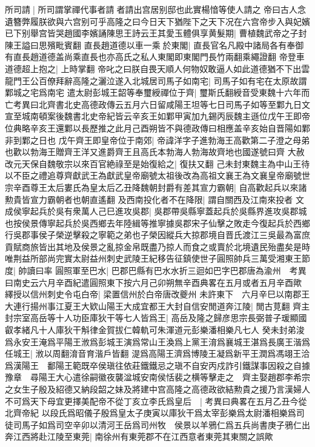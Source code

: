 所司請|{
	所司謂掌禪代事者請者請出宫居别邸也此實楊愔等使人請之}
帝曰古人念遺簪弊履朕欲與六宫别可乎高隆之曰今日天下猶陛下之天下况在六宫帝步入與妃嬪已下别舉宫皆哭趙國李嬪誦陳思王詩云王其愛玉體俱享黄髮期|{
	曹植魏武帝之子封陳王謚曰思殯毗賓翻}
直長趙道德以車一乘於東閣|{
	直長官名凡殿中諸局各有奉御有直長趙道德盖尚乘直長也亦高氏之私人東閣即東閣門長竹兩翻乘繩證翻}
帝登車道德超上抱之|{
	上時掌翻}
帝叱之曰朕自畏天順人何物奴敢逼人如此道德猶不下出雲龍門王公百僚拜辭高隆之灑泣遂入北城居司馬子如南宅|{
	司馬子如有宅在太原故謂鄴城之宅爲南宅}
遣太尉彭城王韶等奉璽綬禪位于齊|{
	璽斯氏翻綬音受東魏十六年而亡考異曰北齊書北史高德政傳云五月六日留咸陽王坦等七日司馬子如等至鄴九日文宣至城南頓案後魏書北史帝紀皆云辛亥王如鄴甲寅加九錫丙辰魏主遜位戊午王即帝位典略辛亥王還鄴以長歷推之此月己酉朔皆不與德政傳曰相應盖辛亥始自晋陽如鄴非到鄴之日也}
戊午齊王即皇帝位于南郊|{
	帝諱洋字子進勃海王高歡第二子澄之母弟也歡以勃海王贈齊王洋又進爵齊王且高氏本勃海人勃海故齊地也國遂號曰齊}
大赦改元天保自魏敬宗以來百官絶祿至是始復給之|{
	復扶又翻}
己未封東魏主為中山王待以不臣之禮追尊齊獻武王為獻武皇帝廟號太祖後改為高祖文襄王為文襄皇帝廟號世宗辛酉尊王太后婁氏為皇太后乙丑降魏朝封爵有差其宣力霸朝|{
	自高歡起兵以來諸勲貴皆宣力霸朝者也朝直遙翻}
及西南投化者不在降限|{
	謂自關西及江南來投者}
文成侯寧起兵於吳有衆萬人己巳進攻吳郡|{
	吳郡帶吳縣寧蓋起兵於吳縣界進攻吳郡城也按侯景傳寧起兵於吳西鄉去年陸緝等推寧據吳郡宋子仙擊之敗走今復起兵於西鄉}
行吳郡事侯子榮逆擊殺之寧範之弟也子榮因縱兵大掠郡境自晋氏渡江三吳最為富庶貢賦商旅皆出其地及侯景之亂掠金帛既盡乃掠人而食之或賣於北境遺民殆盡矣是時唯荆益所部尚完實太尉益州刺史武陵王紀移告征鎮使世子圓照帥兵三萬受湘東王節度|{
	帥讀曰率}
圓照軍至巴水|{
	巴郡巴縣有巴水水折三迴如巴字巴郡唐為渝州　考異曰南史云六月辛酉紀遣圓照東下按六月己卯朔無辛酉典畧在五月或者五月辛酉歟}
繹授以信州刺史令屯白帝|{
	梁置信州於白帝唐改夔州}
未許東下　六月辛巳以南郡王大連行揚州事江夏王大欵山陽王大成宜都王大封自信安閒道奔江陵|{
	閒古莧翻}
齊主封宗室高岳等十人功臣庫狄干等七人皆爲王|{
	高岳及隆之歸彦思宗長弼普子瑗顯國叡孝緒凡十人庫狄干斛律金賀拔仁韓軌可朱渾道元彭樂潘相樂凡七人}
癸未封弟浚爲永安王淹爲平陽王浟爲彭城王演爲常山王渙爲上黨王淯爲襄城王湛爲長廣王湝爲任城王|{
	浟以周翻淯音育湝戶皆翻}
湜爲高陽王濟爲博陵王凝爲新平王潤爲馮翊王洽爲漢陽王　鄱陽王範既卒侯瑱往依莊鐵鐵忌之瑱不自安丙戍詐引鐵謀事因殺之自據豫章　尋陽王大心遣徐嗣徽夜襲湓城安南侯恬裴之横等擊走之　齊主娶趙郡李希宗之女生子殷及紹德又納段韶之妹及將建中宫高隆之高德政欲結勲貴之援乃言漢婦人不可爲天下母宜更擇美配帝不從丁亥立李氏爲皇后　|{
	考異曰典畧在五月乙丑今從北齊帝紀}
以段氏爲昭儀子殷爲皇太子庚寅以庫狄干爲太宰彭樂爲太尉潘相樂爲司徒司馬子如爲司空辛卯以清河王岳爲司州牧　侯景以羊鴉仁爲五兵尚書庚子鴉仁出奔江西將赴江陵至東莞|{
	南徐州有東莞郡不在江西意者東莞其東關之誤歟}
